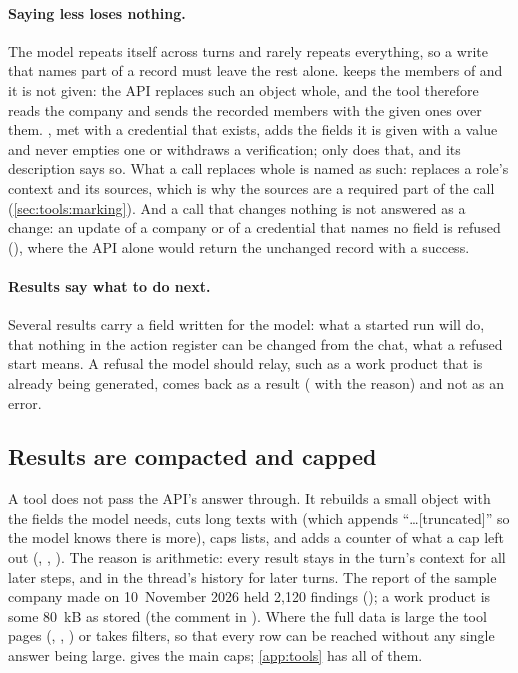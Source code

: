 \paragraph{Saying less loses nothing.} The model repeats itself across turns and rarely
repeats everything, so a write that names part of a record must leave the rest alone.
 keeps the members of  and  it is
not given: the API replaces such an object whole, and the tool therefore reads the company and
sends the recorded members with the given ones over them. , met with a
credential that exists, adds the fields it is given with a value and never empties one or
withdraws a verification; only  does that, and its description says
so. What a call replaces whole is named as such:  replaces a role's context
and its sources, which is why the sources are a required part of the call
(\cref{sec:tools:marking}). And a call that changes nothing is not answered as a change: an
update of a company or of a credential that names no field is refused
(), where the API alone would return the unchanged record with a
success.

\paragraph{Results say what to do next.} Several results carry a field  written for
the model: what a started run will do, that nothing in the action register can be changed from
the chat, what a refused start means. A refusal the model should relay, such as a work product
that is already being generated, comes back as a result ( with the reason)
and not as an error.

\subsection{Results are compacted and capped}\label{sec:chat:caps}

A tool does not pass the API's answer through. It rebuilds a small object with the fields the
model needs, cuts long texts with  (which appends \enquote{…[truncated]} so the
model knows there is more), caps lists, and adds a counter of what a cap left out
(, , ). The reason is arithmetic: every result
stays in the turn's context for all later steps, and in the thread's history for later turns.
The report of the sample company made on 10~November 2026 held 2,120 findings
(); a work product is some 80~kB as stored (the comment in
). Where the full data is large
the tool pages (, , ) or takes filters, so that every
row can be reached without any single answer being large.  gives the main
caps; \cref{app:tools} has all of them.


